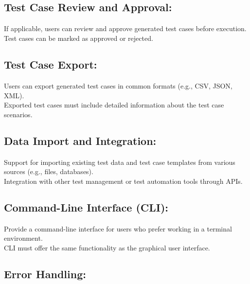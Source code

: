 \documentclass{article}
\begin{document}
\subsection{Test Case Review and Approval:}
\paragraph{}
If applicable, users can review and approve generated test cases before execution.\\
Test cases can be marked as approved or rejected.

\subsection{Test Case Export:}
\paragraph{}
Users can export generated test cases in common formats (e.g., CSV, JSON, XML).\\
Exported test cases must include detailed information about the test case scenarios.

\subsection{Data Import and Integration:}
\paragraph{}
Support for importing existing test data and test case templates from various sources (e.g., files, databases).\\
Integration with other test management or test automation tools through APIs.

\subsection{Command-Line Interface (CLI):}
\paragraph{}
Provide a command-line interface for users who prefer working in a terminal environment.\\
CLI must offer the same functionality as the graphical user interface.

\subsection{Error Handling:}
\end{document}
